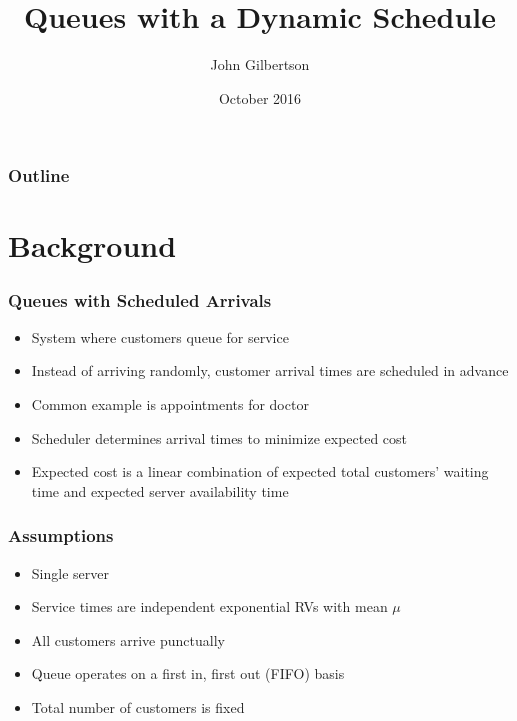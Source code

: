 \documentclass{beamer}
\title{Queues with a Dynamic Schedule}
\author{John Gilbertson}
\date{October 2016}
\begin{document}
\begin{frame}
	\titlepage
\end{frame}

\begin{frame}
	\frametitle{Outline}
	\tableofcontents
\end{frame}

\section{Background}

\begin{frame}
	\frametitle{Queues with Scheduled Arrivals}

	\begin{itemize}
		\item System where customers queue for service
		\item Instead of arriving randomly, customer arrival times are scheduled in advance
		\item Common example is appointments for doctor
		\item Scheduler determines arrival times to minimize expected cost
		\item Expected cost is a linear combination of expected total customers' waiting time and expected server availability time
	\end{itemize}
\end{frame}

\begin{frame}
	\frametitle{Assumptions}

	\begin{itemize}
		\item Single server
		\item Service times are independent exponential RVs with mean $\mu$
		\item All customers arrive punctually
		\item Queue operates on a first in, first out (FIFO) basis
		\item Total number of customers is fixed
	\end{itemize}
\end{frame}
\end{document}
